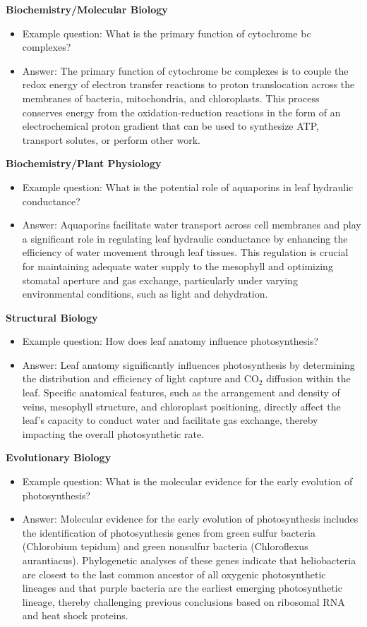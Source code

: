 \documentclass[12pt]{article}
\begin{document}
\textbf{Biochemistry/Molecular Biology} \cite{ref34}
\begin{itemize}
    \item Example question: What is the primary function of cytochrome bc complexes?
    \item Answer: The primary function of cytochrome bc complexes is to couple the redox energy of electron transfer reactions to proton translocation across the membranes of bacteria, mitochondria, and chloroplasts. This process conserves energy from the oxidation-reduction reactions in the form of an electrochemical proton gradient that can be used to synthesize ATP, transport solutes, or perform other work.
\end{itemize}

\textbf{Biochemistry/Plant Physiology} \cite{ref35}
\begin{itemize}
    \item Example question: What is the potential role of aquaporins in leaf hydraulic conductance?
    \item Answer: Aquaporins facilitate water transport across cell membranes and play a significant role in regulating leaf hydraulic conductance by enhancing the efficiency of water movement through leaf tissues. This regulation is crucial for maintaining adequate water supply to the mesophyll and optimizing stomatal aperture and gas exchange, particularly under varying environmental conditions, such as light and dehydration.
\end{itemize}

\textbf{Structural Biology} \cite{ref36}
\begin{itemize}
    \item Example question: How does leaf anatomy influence photosynthesis?
    \item Answer: Leaf anatomy significantly influences photosynthesis by determining the distribution and efficiency of light capture and CO$_2$ diffusion within the leaf. Specific anatomical features, such as the arrangement and density of veins, mesophyll structure, and chloroplast positioning, directly affect the leaf's capacity to conduct water and facilitate gas exchange, thereby impacting the overall photosynthetic rate.
\end{itemize}

\textbf{Evolutionary Biology} \cite{ref37}
\begin{itemize}
    \item Example question: What is the molecular evidence for the early evolution of photosynthesis?
    \item Answer: Molecular evidence for the early evolution of photosynthesis includes the identification of photosynthesis genes from green sulfur bacteria (Chlorobium tepidum) and green nonsulfur bacteria (Chloroflexus aurantiacus). Phylogenetic analyses of these genes indicate that heliobacteria are closest to the last common ancestor of all oxygenic photosynthetic lineages and that purple bacteria are the earliest emerging photosynthetic lineage, thereby challenging previous conclusions based on ribosomal RNA and heat shock proteins.
\end{itemize}
\end{document}
